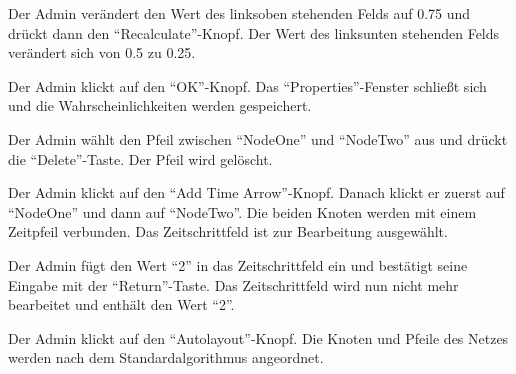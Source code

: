 \documentclass[parskip=full,11pt,twoside]{scrartcl}
\begin{document}
{Der Admin verändert den Wert des linksoben stehenden Felds auf 0.75 und drückt dann den \enquote{Recalculate}-Knopf.}
{Der Wert des linksunten stehenden Felds verändert sich von 0.5 zu 0.25.}

{Der Admin klickt auf den \enquote{OK}-Knopf.}
{Das \enquote{Properties}-Fenster schließt sich und die Wahrscheinlichkeiten werden gespeichert.}

{Der Admin wählt den Pfeil zwischen \enquote{NodeOne} und \enquote{NodeTwo} aus und drückt die \enquote{Delete}-Taste.}
{Der Pfeil wird gelöscht.}

{Der Admin klickt auf den \enquote{Add Time Arrow}-Knopf. Danach klickt er zuerst auf \enquote{NodeOne} und dann auf \enquote{NodeTwo}.}
{Die beiden Knoten werden mit einem Zeitpfeil verbunden. Das Zeitschrittfeld ist zur Bearbeitung ausgewählt.}

{Der Admin fügt den Wert \enquote{2} in das Zeitschrittfeld ein und bestätigt seine Eingabe mit der \enquote{Return}-Taste.}
{Das Zeitschrittfeld wird nun nicht mehr bearbeitet und enthält den Wert \enquote{2}.}



{Der Admin klickt auf den \enquote{Autolayout}-Knopf.}
{Die Knoten und Pfeile des Netzes werden nach dem Standardalgorithmus angeordnet.}

\pagebreak
\end{document}
